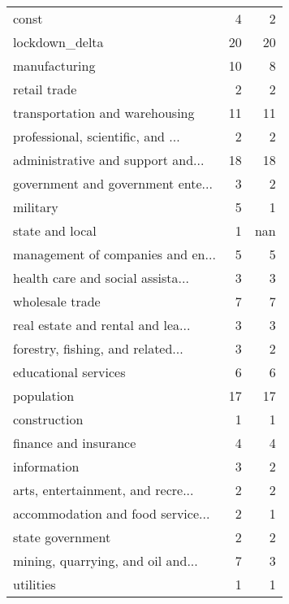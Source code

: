 \begin{tabular}{lrr}
\hline
 const                             &  4 &   2 \\
 lockdown\_delta                    & 20 &  20 \\
 manufacturing                     & 10 &   8 \\
 retail trade                      &  2 &   2 \\
 transportation and warehousing    & 11 &  11 \\
 professional, scientific, and ... &  2 &   2 \\
 administrative and support and... & 18 &  18 \\
 government and government ente... &  3 &   2 \\
 military                          &  5 &   1 \\
 state and local                   &  1 & nan \\
 management of companies and en... &  5 &   5 \\
 health care and social assista... &  3 &   3 \\
 wholesale trade                   &  7 &   7 \\
 real estate and rental and lea... &  3 &   3 \\
 forestry, fishing, and related... &  3 &   2 \\
 educational services              &  6 &   6 \\
 population                        & 17 &  17 \\
 construction                      &  1 &   1 \\
 finance and insurance             &  4 &   4 \\
 information                       &  3 &   2 \\
 arts, entertainment, and recre... &  2 &   2 \\
 accommodation and food service... &  2 &   1 \\
 state government                  &  2 &   2 \\
 mining, quarrying, and oil and... &  7 &   3 \\
 utilities                         &  1 &   1 \\
\hline
\end{tabular}